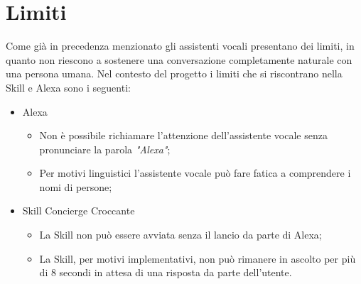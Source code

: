 \section{Limiti}
Come già in precedenza menzionato gli assistenti vocali presentano dei limiti, in quanto non riescono a sostenere una conversazione completamente naturale con una persona umana. Nel contesto del progetto i limiti che si riscontrano nella Skill e Alexa sono i seguenti:
\begin{itemize}
	\item Alexa
	\begin{itemize}
		\item Non è possibile richiamare l'attenzione dell'assistente vocale senza pronunciare la parola \textit{"Alexa"};
		\item Per motivi linguistici l'assistente vocale può fare fatica a comprendere i nomi di persone;
	\end{itemize}
	\item Skill Concierge Croccante
	\begin{itemize}
		\item La Skill non può essere avviata senza il lancio da parte di Alexa;
		\item La Skill, per motivi implementativi, non può rimanere in ascolto per più di 8 secondi in attesa di una risposta da parte dell'utente.
	\end{itemize}
\end{itemize}